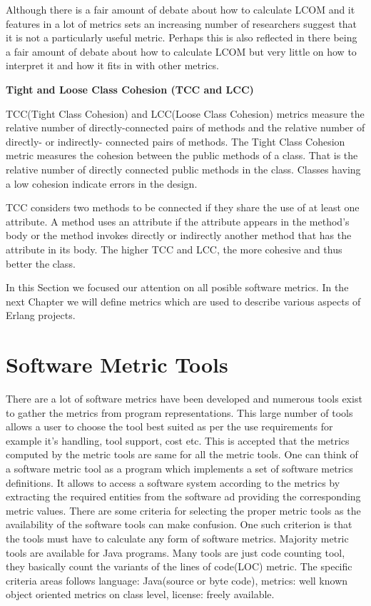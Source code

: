 Although there is a fair amount of debate about how to calculate LCOM and it features in a lot of metrics sets an increasing number of researchers suggest that it is not a particularly useful metric. Perhaps this is also reflected in there being a fair amount of debate about how to calculate LCOM but very little on how to interpret it and how it fits in with other metrics. 

\textbf{Tight and Loose Class Cohesion (TCC and LCC)}

TCC(Tight Class Cohesion) and LCC(Loose Class Cohesion) metrics measure  the  relative number of directly-connected pairs of methods and the   relative   number of directly- or indirectly- connected pairs of methods.
The Tight Class Cohesion metric measures the cohesion between the public methods of a class. That is the relative number of directly connected public methods in the class. Classes having a low cohesion indicate errors in the design.

TCC considers two methods to be connected if they share the  use  of  at  least  one  attribute.  A  method  uses  an  attribute if the attribute appears in the method’s body or  the  method  invokes  directly  or  indirectly  another method   that   has   the   attribute   in   its   body.   
The higher TCC and LCC, the more cohesive and thus better the class.

In this Section we focused our attention on all posible software metrics. In the next Chapter we will define metrics which are used to describe various aspects of Erlang projects. 

\section{Software Metric Tools}
There are a lot of software metrics have been developed and numerous tools exist to gather the metrics from program representations. This large number of tools allows a user to choose the tool best suited as per the use requirements for example it's handling, tool support, cost etc. This is accepted that the metrics computed by the metric tools are same for all the metric tools. One can think of a software metric tool as a program which implements a set of software metrics definitions. It allows to access a software system according to the metrics by extracting the required entities from the software ad providing the corresponding metric values. There are
some criteria for selecting the proper metric tools as the availability of the software tools can make confusion. One such criterion is that the tools must have to calculate any form of software metrics. Majority metric tools are available for Java programs. Many tools are just code counting
tool, they basically count the variants of the lines of code(LOC) metric. The specific criteria areas follows language: Java(source or byte code), metrics: well known object oriented metrics on class level, license: freely available.


